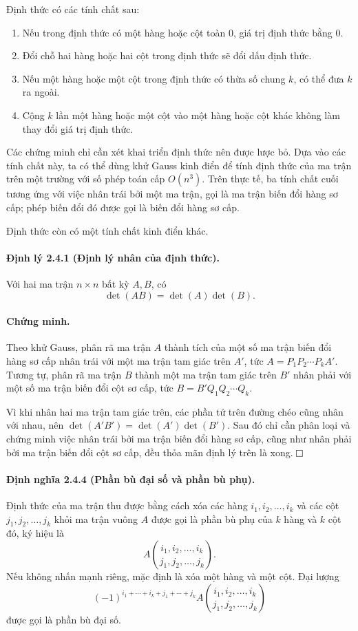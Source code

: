 \documentclass[11pt]{article}
\newcommand{\proofbox}{\ensuremath{\vcenter{\hrule height 0.45pt
  \hbox{\vrule width 0.45pt height 6pt\kern 6pt\vrule width 0.45pt}
  \hrule height 0.45pt}}}
\begin{document}
Định thức có các tính chất sau:
\begin{enumerate}
  \item Nếu trong định thức có một hàng hoặc cột toàn \(0\), giá trị định thức
  bằng \(0\).
  \item Đổi chỗ hai hàng hoặc hai cột trong định thức sẽ đổi dấu định thức.
  \item Nếu một hàng hoặc một cột trong định thức có thừa số chung \(k\), có thể
  đưa \(k\) ra ngoài.
  \item Cộng \(k\) lần một hàng hoặc một cột vào một hàng hoặc cột khác không
  làm thay đổi giá trị định thức.
\end{enumerate}

Các chứng minh chỉ cần xét khai triển định thức nên được lược bỏ. Dựa vào các
tính chất này, ta có thể dùng khử Gauss kinh điển để tính định thức của ma trận
trên một trường với số phép toán cấp \(O(n^3)\). Trên thực tế, ba tính chất cuối
tương ứng với việc nhân trái bởi một ma trận, gọi là ma trận biến đổi hàng sơ
cấp; phép biến đổi đó được gọi là biến đổi hàng sơ cấp.

Định thức còn có một tính chất kinh điển khác.

\paragraph{Định lý 2.4.1 (Định lý nhân của định thức).}
Với hai ma trận \(n\times n\) bất kỳ \(A,B\), có
\[
  \det(AB)=\det(A)\det(B).
\]

\paragraph{Chứng minh.}
Theo khử Gauss, phân rã ma trận \(A\) thành tích của một số ma trận biến đổi
hàng sơ cấp nhân trái với một ma trận tam giác trên \(A'\), tức
\(A=P_1P_2\cdots P_kA'\). Tương tự, phân rã ma trận \(B\) thành một ma trận tam
giác trên \(B'\) nhân phải với một số ma trận biến đổi cột sơ cấp, tức
\(B=B'Q_1Q_2\cdots Q_k\).

Vì khi nhân hai ma trận tam giác trên, các phần tử trên đường chéo cũng nhân
với nhau, nên \(\det(A'B')=\det(A')\det(B')\). Sau đó chỉ cần phân loại và chứng
minh việc nhân trái bởi ma trận biến đổi hàng sơ cấp, cũng như nhân phải bởi ma
trận biến đổi cột sơ cấp, đều thỏa mãn định lý trên là xong. \(\proofbox\)

\paragraph{Định nghĩa 2.4.4 (Phần bù đại số và phần bù phụ).}
Định thức của ma trận thu được bằng cách xóa các hàng
\(i_1,i_2,\ldots,i_k\) và các cột \(j_1,j_2,\ldots,j_k\) khỏi ma trận vuông
\(A\) được gọi là phần bù phụ của \(k\) hàng và \(k\) cột đó, ký hiệu là
\[
  A\binom{i_1,i_2,\ldots,i_k}{j_1,j_2,\ldots,j_k}.
\]
Nếu không nhấn mạnh riêng, mặc định là xóa một hàng và một cột. Đại lượng
\[
  (-1)^{i_1+\cdots+i_k+j_1+\cdots+j_k}
  A\binom{i_1,i_2,\ldots,i_k}{j_1,j_2,\ldots,j_k}
\]
được gọi là phần bù đại số.
\end{document}
